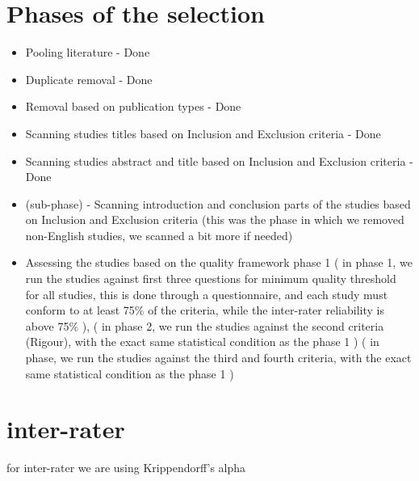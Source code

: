 \documentclass{article}
\theoremstyle{mytheoremstyle}
\theoremstyle{mytheoremstyle}
\theoremstyle{myproblemstyle}
\begin{document}
      \section{Phases of the selection}

      \begin{itemize}
        \item Pooling literature - Done
        \item Duplicate removal - Done  
        \item Removal based on publication types - Done 
        \item Scanning studies titles based on Inclusion and Exclusion criteria - Done  
        \item Scanning studies abstract and title based on Inclusion and Exclusion criteria - Done  
        \item (sub-phase) - Scanning introduction and conclusion parts of the studies based on Inclusion and Exclusion criteria (this was the phase in which we removed non-English studies, we scanned a bit more if needed)
        \item Assessing the studies based on the quality framework phase 1 ( in phase 1, we run the studies against first three questions for minimum quality threshold for all studies, this is done through a questionnaire, and each study must conform to at least 75\% of the criteria, while the inter-rater reliability is above 75\% ), ( in phase 2, we run the studies against the second criteria (Rigour), with the exact same statistical condition as the phase 1 ) ( in phase, we run the studies against the third and fourth criteria, with the exact same statistical condition as the phase 1 )
      \end{itemize}

      \section{inter-rater}
      for inter-rater we are using Krippendorff’s alpha
\end{document}
